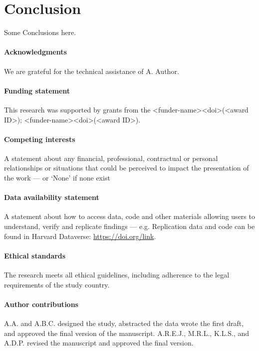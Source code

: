 \documentclass{CUP-JNL-FMP}%
\theoremstyle{definition}
\numberwithin{equation}{section}
\begin{document}
\section{Conclusion}

Some Conclusions here.

\begin{Backmatter}

\paragraph{Acknowledgments}
We are grateful for the technical assistance of A. Author.

\paragraph{Funding statement}
This research was supported by grants from the <funder-name><doi>(<award ID>); <funder-name><doi>(<award ID>).

\paragraph{Competing interests}
A statement about any financial, professional, contractual or personal relationships or situations that could be perceived to impact the presentation of the work --- or `None' if none exist

\paragraph{Data availability statement}
A statement about how to access data, code and other materials allowing users to understand, verify and replicate findings --- e.g. Replication data and code can be found in Harvard Dataverse: \url{https://doi.org/link}.

\paragraph{Ethical standards}
The research meets all ethical guidelines, including adherence to the legal requirements of the study country.

\paragraph{Author contributions}
A.A. and A.B.C. designed the study, abstracted the data wrote the first draft, and approved the final
version of the manuscript. A.R.E.J., M.R.L., K.L.S., and A.D.P. revised the manuscript and approved the final version.


\end{Backmatter}
\end{document}
